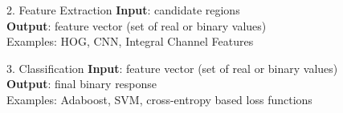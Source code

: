 \begin{frame}{2. Feature Extraction}
\textbf{Input}: candidate regions\\
\textbf{Output}: feature vector (set of real or binary values)\\
Examples: HOG, CNN, Integral Channel Features
\end{frame}

\begin{frame}{3. Classification}
\textbf{Input}: feature vector (set of real or binary values)\\
\textbf{Output}: final binary response\\
Examples: Adaboost, SVM, cross-entropy based loss functions
\end{frame}

